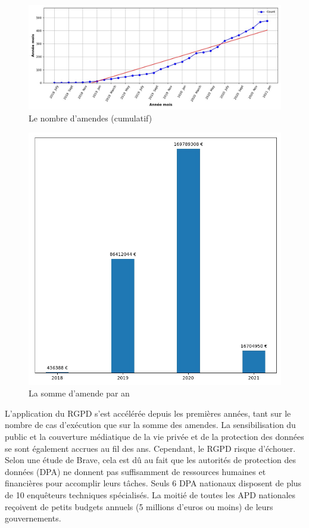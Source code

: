 \documentclass[french]{article}
\begin{document}
	
	\begin{figure}
		[H]\centering\includegraphics[width=0.8\linewidth]{graphs/acc_nb_cases_graph}
		\caption{Le nombre d'amendes (cumulatif) }
	\end{figure}
	
	\begin{multicols}{2}
	\begin{figure}
		[H]\centering\includegraphics[width=1.0\linewidth]{graphs/SumOfFinesperYear}
		\caption{La somme d'amende par an }
	 \end{figure}
\justify
	L'application du RGPD s'est accélérée depuis les premières années, tant sur le nombre de cas d'exécution que sur la somme des amendes. La sensibilisation du public et la couverture médiatique de la vie privée et de la protection des données se sont également accrues au fil des ans. Cependant, le RGPD risque d'échouer. Selon une étude de Brave, cela est dû au fait que les autorités de protection des données (DPA) ne donnent pas suffisamment de ressources humaines et financières pour accomplir leurs tâches. Seuls 6 DPA nationaux disposent de plus de 10 enquêteurs techniques spécialisés. La moitié de toutes les APD nationales reçoivent de petits budgets annuels (5 millions d'euros ou moins) de leurs gouvernements.
	\end{multicols}
\end{document}
